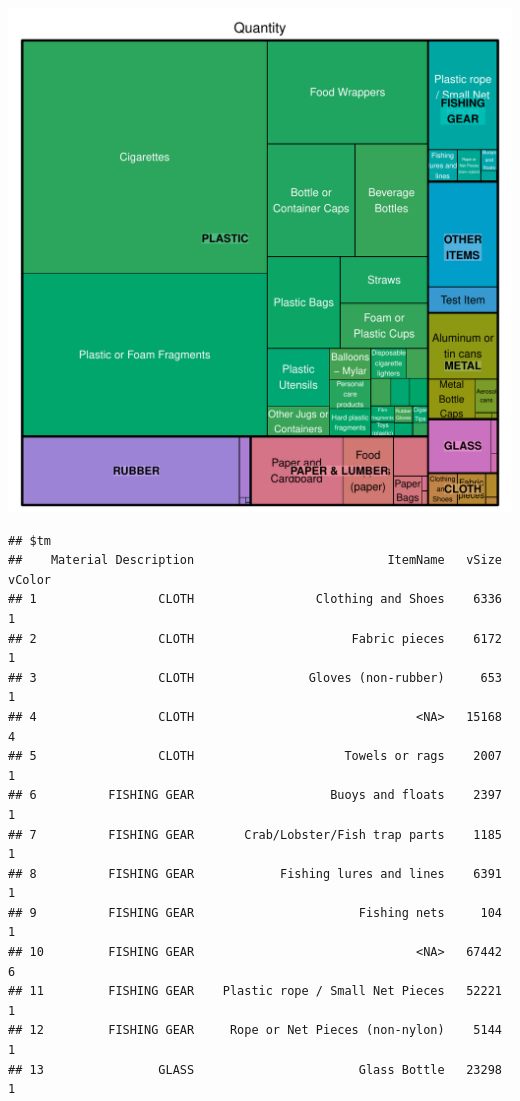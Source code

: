 \documentclass[10pt]{article}\usepackage[]{graphicx}\usepackage[]{color}
\makeatletter
\def\maxwidth{ %
  \ifdim\Gin@nat@width>\linewidth
    \linewidth
  \else
    \Gin@nat@width
  \fi
}
\newenvironment{kframe}{%
 \def\at@end@of@kframe{}%
 \ifinner\ifhmode%
  \def\at@end@of@kframe{\end{minipage}}%
  \begin{minipage}{\columnwidth}%
 \fi\fi%
 \def\FrameCommand##1{\hskip\@totalleftmargin \hskip-\fboxsep
 \colorbox{shadecolor}{##1}\hskip-\fboxsep
     \hskip-\linewidth \hskip-\@totalleftmargin \hskip\columnwidth}%
 \MakeFramed {\advance\hsize-\width
   \@totalleftmargin\z@ \linewidth\hsize
   \@setminipage}}%
 {\par\unskip\endMakeFramed%
 \at@end@of@kframe}
\newenvironment{knitrout}{}{} %
\makeatother
\begin{document}
\begin{itemize}
\begin{knitrout}
\begin{kframe}
{\ttfamily\noindent\bfseries{}}\end{kframe}
\includegraphics[width=\maxwidth]{figure/unnamed-chunk-14-1} 
\begin{kframe}\begin{verbatim}
## $tm
##    Material Description                           ItemName   vSize vColor
## 1                 CLOTH                 Clothing and Shoes    6336      1
## 2                 CLOTH                      Fabric pieces    6172      1
## 3                 CLOTH                Gloves (non-rubber)     653      1
## 4                 CLOTH                               <NA>   15168      4
## 5                 CLOTH                     Towels or rags    2007      1
## 6          FISHING GEAR                   Buoys and floats    2397      1
## 7          FISHING GEAR       Crab/Lobster/Fish trap parts    1185      1
## 8          FISHING GEAR            Fishing lures and lines    6391      1
## 9          FISHING GEAR                       Fishing nets     104      1
## 10         FISHING GEAR                               <NA>   67442      6
## 11         FISHING GEAR    Plastic rope / Small Net Pieces   52221      1
## 12         FISHING GEAR     Rope or Net Pieces (non-nylon)    5144      1
## 13                GLASS                       Glass Bottle   23298      1

\end{verbatim}
\end{kframe}
\end{knitrout}
\end{itemize}
\end{document}

